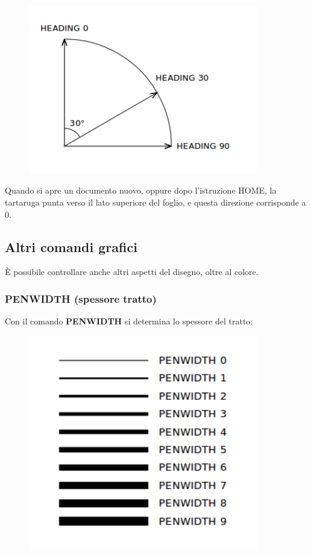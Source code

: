 \begin{figure}[H]
   \centering
   \includegraphics[width=10.0cm,trim=8 8 8 8,clip]{./images/disegnare/disegnare-32.png}
   \label{dis-32}
\end{figure}

\vskip 1cm

Quando si apre un documento nuovo, oppure dopo l'istruzione HOME, la tartaruga punta verso il lato superiore del foglio, e questa direzione corrisponde a 0\degree.

\subsection{Altri comandi grafici}

È possibile controllare anche altri aspetti del disegno, oltre al colore.

\subsubsection{PENWIDTH (spessore tratto)}

Con il comando \textbf{PENWIDTH} si determina lo spessore del tratto:


\vskip 1cm

\begin{figure}[H]
   \centering
   \includegraphics[width=10.0cm,trim=8 8 8 8,clip]{./images/disegnare/disegnare-33.png}
   \label{dis-33}
\end{figure}

